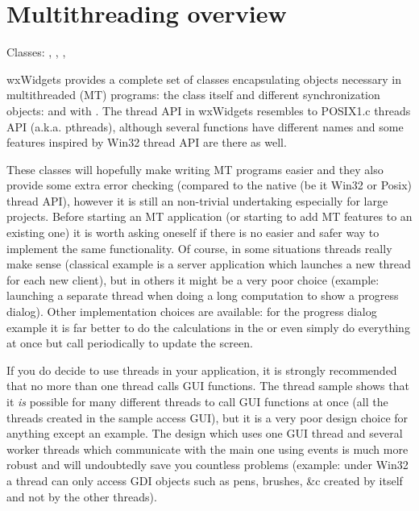 \section{Multithreading overview}\label{wxthreadoverview}

Classes: , , 
, 

wxWidgets provides a complete set of classes encapsulating objects necessary in
multithreaded (MT) programs: the  class itself and different
synchronization objects:  and 
 with 
. The thread API in wxWidgets resembles to
POSIX1.c threads API (a.k.a. pthreads), although several functions have
different names and some features inspired by Win32 thread API are there as
well.

These classes will hopefully make writing MT programs easier and they also
provide some extra error checking (compared to the native (be it Win32 or Posix)
thread API), however it is still an non-trivial undertaking especially for large
projects. Before starting an MT application (or starting to add MT features to
an existing one) it is worth asking oneself if there is no easier and safer way
to implement the same functionality. Of course, in some situations threads
really make sense (classical example is a server application which launches a
new thread for each new client), but in others it might be a very poor choice
(example: launching a separate thread when doing a long computation to show a
progress dialog). Other implementation choices are available: for the progress
dialog example it is far better to do the calculations in the 
 or even simply do everything at once
but call  periodically to update
the screen.

If you do decide to use threads in your application, it is strongly recommended
that no more than one thread calls GUI functions. The thread sample shows that
it {\it is} possible for many different threads to call GUI functions at once
(all the threads created in the sample access GUI), but it is a very poor design
choice for anything except an example. The design which uses one GUI thread and
several worker threads which communicate with the main one using events is much
more robust and will undoubtedly save you countless problems (example: under
Win32 a thread can only access GDI objects such as pens, brushes, \&c created by
itself and not by the other threads).

